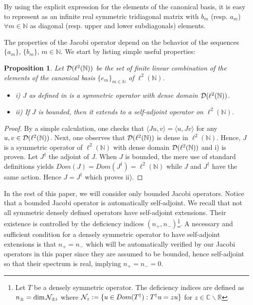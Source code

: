 \documentclass[10pt]{book}
\theoremstyle{break}
\newtheorem{proposition}{Proposition}
\begin{document}
By using the explicit expression for the elements of the canonical basis, it is easy to represent %
as an infinite real symmetric tridiagonal matrix with $b_m$ (resp. $a_m$) $\forall m\in\mathbb{N}$ as diagonal (resp. upper and lower subdiagonals) elements. \par 
The properties of the Jacobi operator depend on the behavior of the sequences $\{a_m\}$, $\{b_m\}$, $m\in\mathbb{N}$. We start by listing simple useful properties:
\begin{proposition}
Let ${\cal{D}}(\ell^2(\mathbb{N}))$ be the set of finite linear combination of the elements of the canonical basis $\{e_m\}_{m\in\mathbb{N}}$ of $\ell^2(\mathbb{N})$.
\begin{itemize}
\vspace*{-3pt}
\setlength{\itemsep}{-1pt}
\item i) $J$ as defined in %
is a symmetric operator with dense domain ${\cal{D}}(\ell^2(\mathbb{N}))$.
\item ii) If $J$ is bounded, then it extends to a self-adjoint operator on $\ell^2(\mathbb{N})$.
\end{itemize}
\end{proposition}
\begin{proof}
By a simple calculation, one checks that $\langle Ju,v \rangle=\langle u,Jv \rangle$ for any $u,v\in{\cal{D}}(\ell^2(\mathbb{N}))$. Next, one observes that ${\cal{D}}(\ell^2(\mathbb{N}))$ is dense in $\ell^2(\mathbb{N})$. Hence, $J$ is a symmetric operator of $\ell^2(\mathbb{N})$ with dense domain ${\cal{D}}(\ell^2(\mathbb{N}))$ and i) is proven. Let $J^\dag$ the adjoint of $J$. When $J$ is bounded, the mere use of standard definitions yields $Dom(J)=Dom(J^\dag)=\ell^2(\mathbb{N})$ while $J$ and $J^\dag$ have the same action. Hence 
$J=J^\dag$ which proves ii).
\end{proof}
In the rest of this paper, we will consider only bounded Jacobi operators. Notice that a bounded Jacobi operator is automatically self-adjoint. We recall that not all symmetric densely defined operators have self-adjoint extensions. Their existence is controlled by the deficiency indices $(n_+,n_-)${\footnote{Let $T$ be a densely symmetric operator. The deficiency indices are defined as $n_\pm=\dim{\cal{N}}_{\pm i}$ where ${\cal{N}}_z:=\{u\in Dom(T^\dag):T^\dag u=zu \}$ for $z\in\mathbb{C}\backslash\mathbb{R}$}}. A necessary and sufficient condition for a densely symmetric operator to have self-adjoint extensions is that $n_+=n_-$ which will be automatically verified by our Jacobi operators in this paper since they are  assumed to be bounded, hence self-adjoint so that their spectrum is real, implying $n_+=n_-=0$.\par
\end{document}
